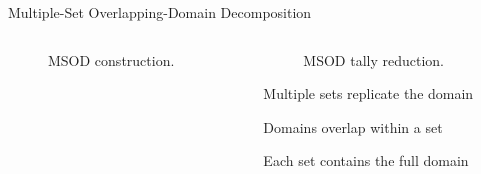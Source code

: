 \documentclass{beamer}
\begin{document}
\begin{frame}[fragile]{Multiple-Set Overlapping-Domain Decomposition}

  \vspace{-1cm}
  \begin{columns}

    \begin{column}{0.52\textwidth}

      \begin{figure}[t!]
        \begin{center}
          \scalebox{0.275}{  }
        \end{center}
        \caption{\small MSOD construction.}
      \end{figure}

    \end{column}

    \begin{column}{0.48\textwidth}

      \begin{figure}[t!]
        \begin{center}
          \scalebox{0.2}{  }
        \end{center}
        \caption{\small MSOD tally reduction.}
      \end{figure}

      \begin{itemize}
        {\small
        \item Multiple sets replicate the domain
        \item Domains overlap within a set
        \item Each set contains the full domain
        }
      \end{itemize}

    \end{column}

  \end{columns}


\end{frame}
\end{document}
